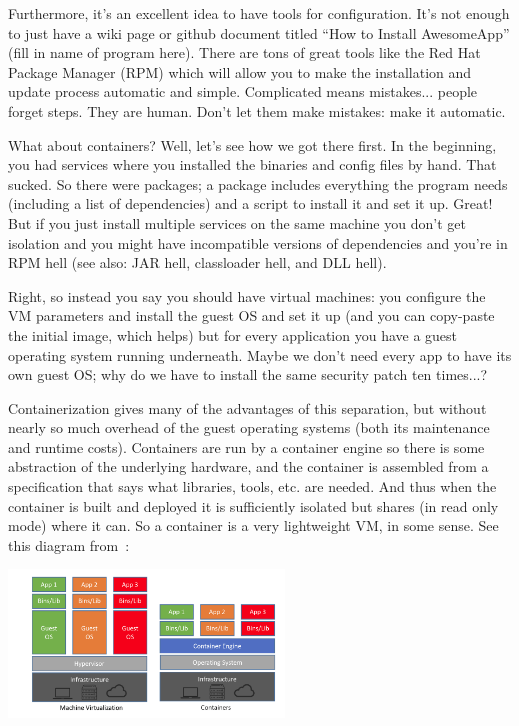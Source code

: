\documentclass[a4paper]{report}
\begin{document}
Furthermore, it's an excellent idea to have tools for configuration. It's not enough to just have a wiki page or github document titled ``How to Install AwesomeApp'' (fill in name of program here). There are tons of great tools like the Red Hat Package Manager (RPM) which will allow you to make the installation and update process automatic and simple. Complicated means mistakes... people forget steps. They are human. Don't let them make mistakes: make it automatic.

What about containers? Well, let's see how we got there first. In the beginning, you had services where you installed the binaries and config files by hand. That sucked. So there were packages; a package includes everything the program needs (including a list of dependencies) and a script to install it and set it up. Great! But if you just install multiple services on the same machine you don't get isolation and you might have incompatible versions of dependencies and you're in RPM hell (see also: JAR hell, classloader hell, and DLL hell).

Right, so instead you say you should have virtual machines: you configure the VM parameters and install the guest OS and set it up (and you can copy-paste the initial image, which helps) but for every application you have a guest operating system running underneath. Maybe we don't need every app to have its own guest OS; why do we have to install the same security patch ten times...?

Containerization gives many of the advantages of this separation, but without nearly so much overhead of the guest operating systems (both its maintenance and runtime costs). Containers are run by a container engine so there is some abstraction of the underlying hardware, and the container is assembled from a specification that says what libraries, tools, etc. are needed. And thus when the container is built and deployed it is sufficiently isolated but shares (in read only mode) where it can. So a container is a very lightweight VM, in some sense. See this diagram from~\cite{netappcontainer}:

\begin{center}
	\includegraphics[width=0.55\textwidth]{images/cvm.png}
\end{center}
\end{document}
